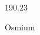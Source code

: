 \documentclass[12pt]{article}
\begin{document}
\hfill{}
\vfill
\begin{center}
  {\fontsize{50}{60}
  }

  \vspace{1em}

  190.23

Osmium
\end{center}
\vfill
\end{document}
